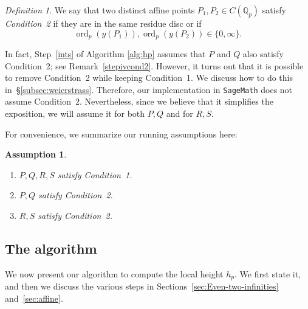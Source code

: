\documentclass[11pt, a4paper]{amsart}
\newcommand{\Q}{\mathbb{Q}}
\newcommand{\ord}{\operatorname{ord}}
\newtheorem{ass}{Assumption}
\theoremstyle{remark}
\newtheorem{definition}[theorem]{Definition}
\numberwithin{equation}{section}
\newcommand{\sg}{{}}
\newcommand{\sm}{{}}
\begin{document}
\sg{

\begin{definition}
  We say that two distinct affine points $P_1, P_2\in C(\Q_p)$ satisfy \textit{Condition~2} if they are in the same residue disc or if \[\ord_p(y(P_1)),\ord_p(y(P_2))\in\{0,\infty\}.\]
\end{definition}

In fact, Step~\eqref{ints} of Algorithm \ref{alg:hp} assumes that $P$ and $Q$ also satisfy Condition~2; see Remark~\ref{stepivcond2}.
However, it turns out that it is possible to remove Condition~2 while keeping Condition~1. We discuss how to do this in~\S\ref{subsec:weierstrass}.
Therefore, our implementation in {\tt SageMath} does not assume Condition~2. Nevertheless, since we believe that it simplifies the exposition, we will assume it for both $P,Q$ and for $R,S$.

For convenience, we summarize our running assumptions here:
\begin{ass}\label{assumptions}
\hfill
\begin{enumerate}
\item $P,Q,R,S$ satisfy Condition~1.
\item $P,Q$ satisfy Condition~2.
\item $R,S$ satisfy Condition~2.
\end{enumerate}
\end{ass}
}




\subsection{The algorithm}
\sm{We now present our algorithm to compute the local height $h_p$. We first state it, and then we discuss the various steps in Sections~\ref{sec:Even-two-infinities} and~\ref{sec:affine}.}
\end{document}
